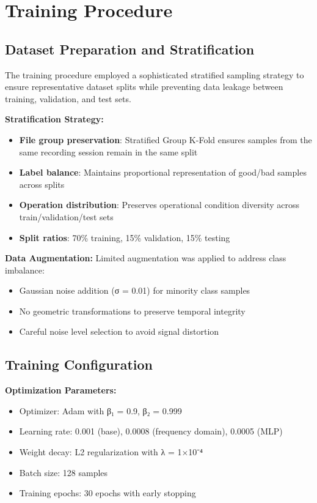 \documentclass[12pt]{article}
\begin{document}
\section{Training Procedure}

\subsection{Dataset Preparation and Stratification}

The training procedure employed a sophisticated stratified sampling strategy to ensure representative dataset splits while preventing data leakage between training, validation, and test sets.

\textbf{Stratification Strategy:}
\begin{itemize}
    \item \textbf{File group preservation}: Stratified Group K-Fold ensures samples from the same recording session remain in the same split
    \item \textbf{Label balance}: Maintains proportional representation of good/bad samples across splits
    \item \textbf{Operation distribution}: Preserves operational condition diversity across train/validation/test sets
    \item \textbf{Split ratios}: 70\% training, 15\% validation, 15\% testing
\end{itemize}

\textbf{Data Augmentation:}
Limited augmentation was applied to address class imbalance:
\begin{itemize}
    \item Gaussian noise addition (σ = 0.01) for minority class samples
    \item No geometric transformations to preserve temporal integrity
    \item Careful noise level selection to avoid signal distortion
\end{itemize}

\subsection{Training Configuration}

\textbf{Optimization Parameters:}
\begin{itemize}
    \item Optimizer: Adam with β₁ = 0.9, β₂ = 0.999
    \item Learning rate: 0.001 (base), 0.0008 (frequency domain), 0.0005 (MLP)
    \item Weight decay: L2 regularization with λ = 1×10⁻⁴
    \item Batch size: 128 samples
    \item Training epochs: 30 epochs with early stopping
\end{itemize}
\end{document}
